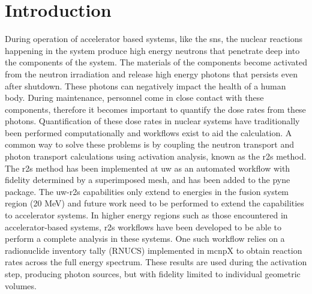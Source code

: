 \section{Introduction}\label{sc:intro}
During operation of accelerator based systems, like the \gls{sns},
the nuclear reactions happening in the system produce high
energy neutrons that penetrate deep into the components of the system.
The materials of the components become activated from the neutron irradiation
and release high energy photons that persists even after shutdown. These
photons can negatively impact the health of a human body. During maintenance,
personnel come in close contact with these components, therefore it becomes
important to quantify the dose rates from these photons.
Quantification of these dose rates in nuclear systems have traditionally been
performed computationally and workflows exist to aid the calculation.
A common way to solve these problems is by coupling the neutron transport and
photon transport calculations using activation analysis, known as the \gls{r2s}
method. The \gls{r2s} method has been implemented at \gls{uw} as an automated
workflow with fidelity determined by a superimposed mesh, and has been added
to the \gls{pyne} package. The \gls{uw}-\gls{r2s} capabilities
only extend to energies in the fusion system region (20 MeV) and future work
need to be performed to extend the capabilities to accelerator systems.
In higher energy regions such as those encountered in accelerator-based
systems, \gls{r2s} workflows have been developed to be able to perform a complete
analysis in these systems. One such workflow relies on a radionuclide
inventory tally (RNUCS) implemented in \gls{mcnp}X to obtain reaction rates across
the full energy spectrum.  These results are used during the activation step,
producing photon sources, but with fidelity limited to individual geometric
volumes.
\newpage
